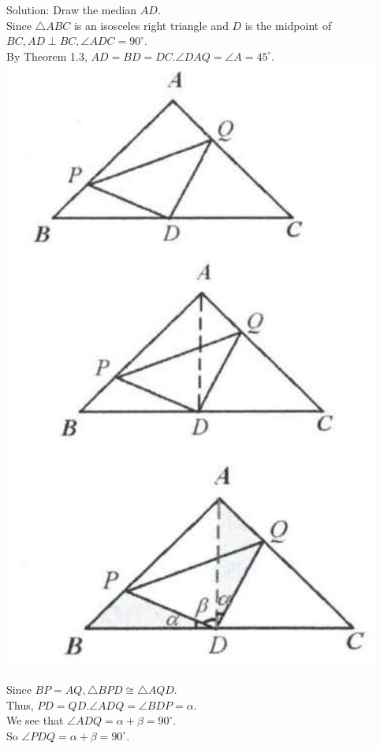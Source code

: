 \documentclass[10pt]{article}
\begin{document}
Solution:
Draw the median \(A D\).\\
Since \(\triangle A B C\) is an isosceles right triangle and \(D\) is the midpoint of \(B C, A D \perp B C, \angle A D C=90^{\circ}\).\\
By Theorem 1.3, \(A D=B D=D C . \angle D A Q=\angle A=45^{\circ}\).\\
\includegraphics[max width=\textwidth, center]{2025_04_17_97bc1f7e44d93c271a88g-013(1)}

Since \(B P=A Q, \triangle B P D \cong \triangle A Q D\).\\
Thus, \(P D=Q D . \angle A D Q=\angle B D P=\alpha\).\\
We see that \(\angle A D Q=\alpha+\beta=90^{\circ}\).\\
So \(\angle P D Q=\alpha+\beta=90^{\circ}\).
\end{document}
